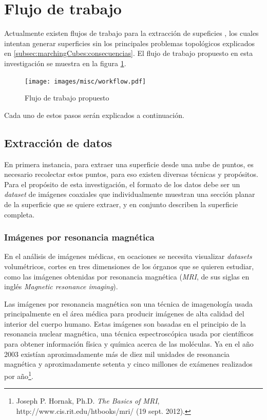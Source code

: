 \section{Flujo de trabajo}
\label{ch:propuesta:sec:flujoDeTrabajo}

Actualmente existen flujos de trabajo para la extracción de supeficies \cite{Ruprecht94ascheme}\cite{Dietrich_marchingcubes}, los cuales intentan generar superficies sin los principales problemas topológicos explicados en \ref{subsec:marchingCubes:consecuencias}. El flujo de trabajo propuesto en esta investigación se muestra en la figura \ref{f:flujoDeTrabajo:flujoDeTrabajo}.

\begin{figure}[htb]
\centering
	\texttt{[image: images/misc/workflow.pdf]}
\caption{Flujo de trabajo propuesto}
\label{f:flujoDeTrabajo:flujoDeTrabajo}
\end{figure}

Cada uno de estos pasos serán explicados a continuación.
\newpage

\subsection{Extracción de datos}
\label{ch:propuesta:sec:extraccionDeDatos}

En primera instancia, para extraer una superficie desde una nube de puntos, es necesario recolectar estos puntos, para eso existen diversas técnicas y propósitos. Para el propósito de esta investigación, el formato de los datos debe ser un \emph{dataset} de imágenes coaxiales que individualmente muestran una sección planar de la superficie que se quiere extraer, y en conjunto describen la superficie completa.

\subsubsection{Imágenes por resonancia magnética}
\label{ch:propuesta:sec:extraccionDeDatos:subsec:imagenesPorResonanciaMagnetica}

En el análisis de imágenes médicas, en ocaciones se necesita visualizar \emph{datasets} volumétricos, cortes en tres dimensiones de los órganos que se quieren estudiar, como las imágenes obtenidas por resonancia magnética (\emph{MRI}, de sus siglas en inglés \emph{Magnetic resonance imaging}).

Las imágenes por resonancia magnética son una técnica de imagenología usada principalmente en el área médica para producir imágenes de alta calidad del interior del cuerpo humano. Estas imágenes son basadas en el principio de la resonancia nuclear magnética, una técnica espectroscópica usada por científicos para obtener información física y química acerca de las moléculas. Ya en el año 2003 existían aproximadamente más de diez mil unidades de resonancia magnética y aproximadamente setenta y cinco millones de exámenes realizados por año\footnote{Joseph P. Hornak, Ph.D. \textit{The Basics of MRI}, http://www.cis.rit.edu/htbooks/mri/ (19 sept. 2012).}.

